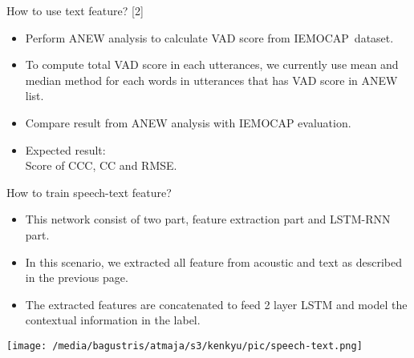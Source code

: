 \documentclass[aspectratio=169]{beamer}
\begin{document}
\begin{frame}[t, fragile]{How to use text feature? [2]}
\begin{itemize}
\item Perform ANEW analysis to calculate VAD score from IEMOCAP\footnotemark ~dataset.
\item To compute total VAD score in each utterances, we currently use mean and median
      method for each words in utterances that has VAD score in ANEW list.
\item Compare result from ANEW analysis with IEMOCAP evaluation.
\item Expected result: \\
      Score of CCC, CC and RMSE.
\end{itemize}
\end{frame}


\begin{frame}[t, fragile]{How to train speech-text feature?}
\begin{itemize}
\item This network consist of two part, feature extraction part and LSTM-RNN part.
\item In this scenario, we extracted all feature from acoustic and text as described
      in the previous page.
\item The extracted features are concatenated to feed 2 layer LSTM and model the 
      contextual information in the label.
\end{itemize}
\texttt{[image: /media/bagustris/atmaja/s3/kenkyu/pic/speech-text.png]}
\end{frame}
\end{document}
